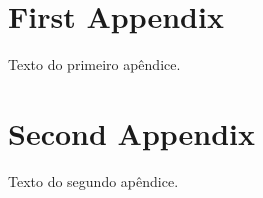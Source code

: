 \begin{apendicesenv}

\partapendices

\chapter{First Appendix}

Texto do primeiro apêndice.

\chapter{Second Appendix}

Texto do segundo apêndice.

\end{apendicesenv}
